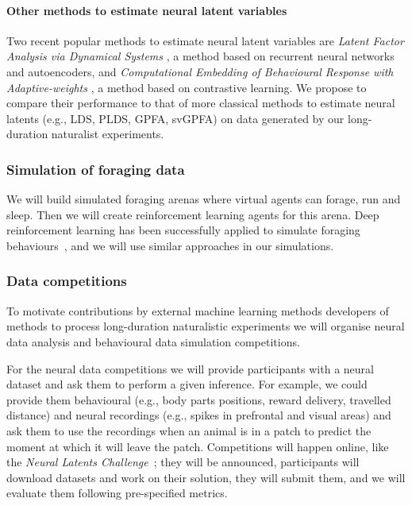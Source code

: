 \paragraph{Other methods to estimate neural latent variables}

Two recent popular methods to estimate neural latent variables are \emph{Latent
Factor Analysis via Dynamical Systems} \citep[LFADS][]{pandarinathEtAl18}, a
method based on recurrent neural networks and autoencoders, and
\emph{Computational Embedding of Behavioural Response with Adaptive-weights}
\citep[CEBRA]{schneiderEtAl23}, a method based on contrastive learning. We
propose to compare their performance to that of more classical methods to
estimate neural latents (e.g., LDS, PLDS, GPFA, svGPFA) on data generated by
our long-duration naturalist experiments.

\subsubsection{Simulation of foraging data}

We will build simulated foraging arenas where virtual agents can forage, run
and sleep. Then we will create reinforcement learning agents for this arena.
Deep reinforcement learning has been successfully applied to simulate foraging
behaviours~\citep{wispinskiEtAl22}, and we will use similar approaches in our
simulations.

\subsubsection{Data competitions}

To motivate contributions by external machine learning methods developers of
methods to process long-duration naturalistic experiments we will organise
neural data analysis and behavioural data simulation competitions.

For the neural data competitions we will provide participants with a neural
dataset and ask them to perform a given inference. For example, we could
provide them behavioural (e.g., body parts positions, reward delivery, travelled
distance) and neural recordings (e.g., spikes in prefrontal and visual areas)
and ask them to use the recordings when an animal is in a patch to predict the
moment at which it will leave the patch. Competitions will happen online, like
the \emph{Neural Latents Challenge}~\citep{peiEtAl22}; they will be announced,
participants will download datasets and work on their solution, they will
submit them, and we will evaluate them following pre-specified metrics.

